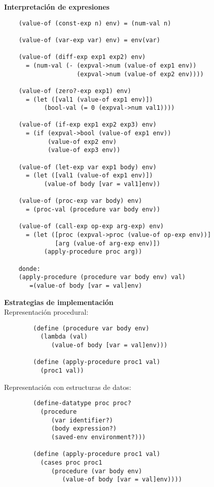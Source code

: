 \documentclass{article}
\begin{document}
    \textbf{Interpretación de expresiones}\\
    \begin{verbatim}
    (value-of (const-exp n) env) = (num-val n)
    
    (value-of (var-exp var) env) = env(var)
    
    (value-of (diff-exp exp1 exp2) env)
      = (num-val (- (expval->num (value-of exp1 env))
                    (expval->num (value-of exp2 env))))
                    
    (value-of (zero?-exp exp1) env)
      = (let ([val1 (value-of exp1 env)])
           (bool-val (= 0 (expval->num val1))))
           
    (value-of (if-exp exp1 exp2 exp3) env)
      = (if (expval->bool (value-of exp1 env))
            (value-of exp2 env)
            (value-of exp3 env))
    
    (value-of (let-exp var exp1 body) env)
      = (let ([val1 (value-of exp1 env)])
           (value-of body [var = val1]env))
           
    (value-of (proc-exp var body) env)
      = (proc-val (procedure var body env))
      
    (value-of (call-exp op-exp arg-exp) env)
      = (let ([proc (expval->proc (value-of op-exp env))]
              [arg (value-of arg-exp env)])
           (apply-procedure proc arg))
           
    donde:
    (apply-procedure (procedure var body env) val)
       =(value-of body [var = val]env)
    \end{verbatim}
    
    \textbf{Estrategias de implementación}\\
    Representación procedural:\\
    \begin{verbatim}
        (define (procedure var body env)
          (lambda (val)
             (value-of body [var = val]env)))
             
        (define (apply-procedure proc1 val)
          (proc1 val))
    \end{verbatim}
    Representación con estructuras de datos:\\
    \begin{verbatim}
        (define-datatype proc proc?
          (procedure
             (var identifier?)
             (body expression?)
             (saved-env environment?)))
        
        (define (apply-procedure proc1 val)
          (cases proc proc1
             (procedure (var body env)
                (value-of body [var = val]env))))
    \end{verbatim}
\end{document}
